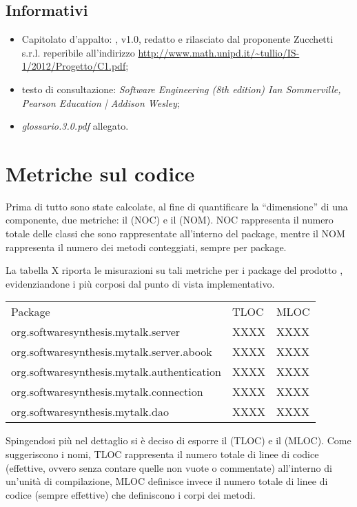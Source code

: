 \subsection{Informativi}
\begin{itemize}
\item[] Capitolato d'appalto: \caName{}, v1.0, redatto e rilasciato dal proponente Zucchetti s.r.l. reperibile all'indirizzo \url{http://www.math.unipd.it/~tullio/IS-1/2012/Progetto/C1.pdf};
\item[] testo di consultazione: \textit{Software Engineering (8th edition) Ian Sommerville, Pearson Education | Addison Wesley};
\item[] \textit{glossario.3.0.pdf} allegato.
\end{itemize}
\clearpage

\section{Metriche sul codice}
Prima di tutto sono state calcolate, al fine di quantificare la ``dimensione'' di una componente, due metriche: il  (NOC) e il  (NOM).
NOC rappresenta il numero totale delle classi che sono rappresentate all'interno del package, mentre il NOM rappresenta il numero dei metodi conteggiati, sempre per package.

La tabella X riporta le misurazioni su tali metriche per i package del prodotto \caName{}, evidenziandone i più corposi dal punto di vista implementativo.


\begin{center}
\begin{longtable}{p{}ll}
\toprule Package & TLOC  & MLOC\\
org.softwaresynthesis.mytalk.server & XXXX & XXXX\\
org.softwaresynthesis.mytalk.server.abook & XXXX & XXXX\\
org.softwaresynthesis.mytalk.authentication & XXXX & XXXX\\
org.softwaresynthesis.mytalk.connection & XXXX & XXXX\\
org.softwaresynthesis.mytalk.dao & XXXX & XXXX\\
\midrule

\bottomrule
\end{longtable}
\end{center}


Spingendosi più nel dettaglio si è deciso di esporre il  (TLOC) e il  (MLOC).
Come suggeriscono i nomi, TLOC rappresenta il numero totale di linee di codice (effettive, ovvero senza contare quelle non vuote o commentate) all'interno di un'unità di compilazione, MLOC definisce invece il numero totale di linee di codice (sempre effettive) che definiscono i corpi dei metodi. 

